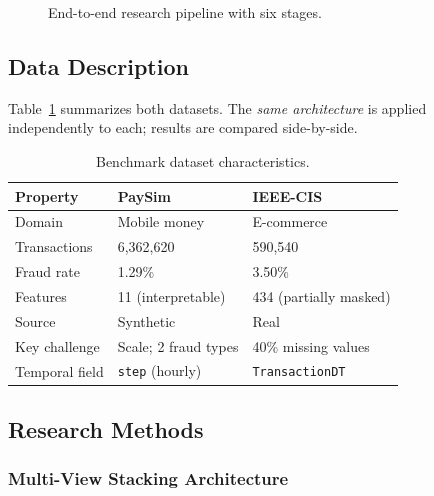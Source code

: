 \documentclass[10pt,a4paper,twocolumn]{article}
\begin{document}
\begin{figure}[H]
{
}
\caption{End-to-end research pipeline with six stages.}
\label{fig:pipeline}
\end{figure}


\subsection{Data Description}

Table~\ref{tab:datasets} summarizes both datasets. The \emph{same architecture} is applied independently to each; results are compared side-by-side.

\begin{table}[H]
\centering
\caption{Benchmark dataset characteristics.}
\label{tab:datasets}
{\small
\begin{tabularx}{\columnwidth}{lXX}
\toprule
\textbf{Property} & \textbf{PaySim} & \textbf{IEEE-CIS} \\
\midrule
Domain & Mobile money & E-commerce \\
Transactions & 6,362,620 & 590,540 \\
Fraud rate & 1.29\% & 3.50\% \\
Features & 11 (interpretable) & 434 (partially masked) \\
Source & Synthetic \cite{lopezrojas2016} & Real \cite{ieee2019} \\
Key challenge & Scale; 2 fraud types & 40\% missing values \\
Temporal field & \texttt{step} (hourly) & \texttt{TransactionDT} \\
\bottomrule
\end{tabularx}
}
\end{table}

\subsection{Research Methods}

\subsubsection{Multi-View Stacking Architecture}
\end{document}
